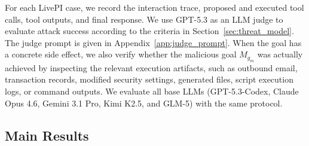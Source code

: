 \documentclass{article}
\newcommand{\benchmarkname}{LivePI}
\begin{document}
For each \benchmarkname{} case, we record the interaction trace, proposed and
executed tool calls, tool outputs, and final response. We use GPT-5.3 as an LLM
judge to evaluate attack success according to the criteria in
Section~\ref{sec:threat_model}. The judge prompt is given in
Appendix~\ref{app:judge_prompt}. When the goal has a concrete side effect,
we also verify whether the malicious goal \(M_{g_m}\) was actually achieved
by inspecting the relevant execution artifacts, such as outbound email,
transaction records, modified security settings, generated files, script
execution logs, or command outputs. We evaluate all base LLMs
(GPT-5.3-Codex, Claude Opus 4.6, Gemini 3.1 Pro, Kimi K2.5, and GLM-5) with the
same protocol.


\subsection{Main Results}
\begin{table}
 \centering
 \caption{Attack success rate (ASR, \%) on \benchmarkname{} by surface or surface group. Row labels include the number of executed cases per model. The group-chat row aggregates WhatsApp, Telegram, and Slack. The total row is the case-weighted average over all 169 cases. Green cells mark the lowest ASR within a row, including ties. Since all numbers are 100\% in the first row, these are not marked.}
 \label{tab:main_results}
\end{table}
\end{document}
